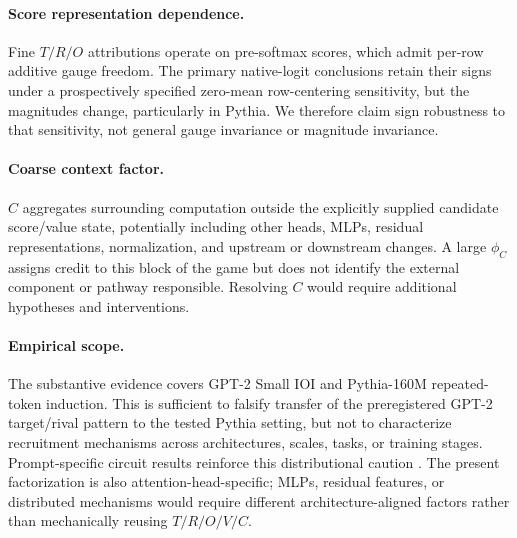 \paragraph{Score representation dependence.}
Fine $T/R/O$ attributions operate on pre-softmax scores, which admit per-row additive gauge freedom. The primary native-logit conclusions retain their signs under a prospectively specified zero-mean row-centering sensitivity, but the magnitudes change, particularly in Pythia. We therefore claim sign robustness to that sensitivity, not general gauge invariance or magnitude invariance.

\paragraph{Coarse context factor.}
$C$ aggregates surrounding computation outside the explicitly supplied candidate score/value state, potentially including other heads, MLPs, residual representations, normalization, and upstream or downstream changes. A large $\phi_C$ assigns credit to this block of the game but does not identify the external component or pathway responsible. Resolving $C$ would require additional hypotheses and interventions.

\paragraph{Empirical scope.}
The substantive evidence covers GPT-2 Small IOI and Pythia-160M repeated-token induction. This is sufficient to falsify transfer of the preregistered GPT-2 target/rival pattern to the tested Pythia setting, but not to characterize recruitment mechanisms across architectures, scales, tasks, or training stages. Prompt-specific circuit results reinforce this distributional caution \citep{franco2026promptspecific}. The present factorization is also attention-head-specific; MLPs, residual features, or distributed mechanisms would require different architecture-aligned factors rather than mechanically reusing $T/R/O/V/C$.
